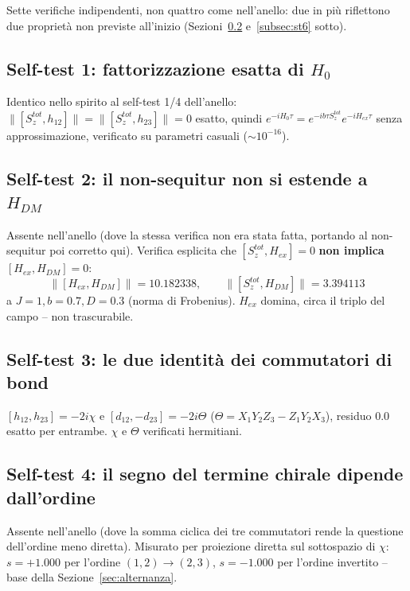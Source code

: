 \documentclass[11pt,a4paper]{article}
\begin{document}
Sette verifiche indipendenti, non quattro come nell'anello: due in più
riflettono due proprietà non previste all'inizio (Sezioni~\ref{subsec:st2}
e~\ref{subsec:st6} sotto).

\subsection{Self-test 1: fattorizzazione esatta di $H_0$}

Identico nello spirito al self-test 1/4 dell'anello: $\|[S_z^{tot},h_{12}]\|=\|[S_z^{tot},h_{23}]\|=0$ esatto, quindi $e^{-iH_0\tau}=e^{-ib\tau S_z^{tot}}e^{-iH_{ex}\tau}$ senza approssimazione, verificato su parametri casuali ($\sim10^{-16}$).

\subsection{Self-test 2: il non-sequitur non si estende a $H_{DM}$}
\label{subsec:st2}

Assente nell'anello (dove la stessa verifica non era stata fatta, portando al non-sequitur poi corretto qui). Verifica esplicita che $[S_z^{tot},H_{ex}]=0$ \textbf{non implica} $[H_{ex},H_{DM}]=0$:
\begin{equation}
\|[H_{ex},H_{DM}]\| = 10.182338, \qquad \|[S_z^{tot},H_{DM}]\| = 3.394113
\end{equation}
a $J{=}1,b{=}0.7,D{=}0.3$ (norma di Frobenius). $H_{ex}$ domina, circa il triplo del campo -- non trascurabile.

\subsection{Self-test 3: le due identità dei commutatori di bond}

$[h_{12},h_{23}]=-2i\chi$ e $[d_{12},-d_{23}]=-2i\Theta$ ($\Theta=X_1Y_2Z_3-Z_1Y_2X_3$), residuo $0.0$ esatto per entrambe. $\chi$ e $\Theta$ verificati hermitiani.

\subsection{Self-test 4: il segno del termine chirale dipende dall'ordine}

Assente nell'anello (dove la somma ciclica dei tre commutatori rende la questione dell'ordine meno diretta). Misurato per proiezione diretta sul sottospazio di $\chi$: $s=+1.000$ per l'ordine $(1,2)\to(2,3)$, $s=-1.000$ per l'ordine invertito -- base della Sezione~\ref{sec:alternanza}.
\end{document}
